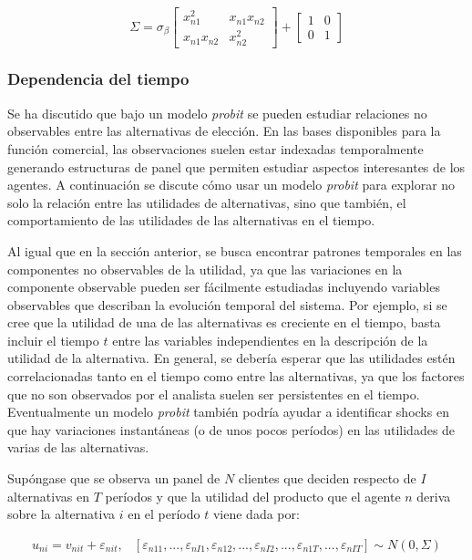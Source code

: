 \documentclass[
]{book}
\begin{document}
\[Σ= \sigma_\beta \begin{bmatrix}x^2_{n1} & x_{n1}x_{n2}\\
x_{n1}x_{n2} & x^2_{n2} \end{bmatrix} + \begin{bmatrix}1 & 0\\
0 & 1\end{bmatrix}\]

\subsubsection{Dependencia del tiempo}\label{dependencia-del-tiempo}

Se ha discutido que bajo un modelo \emph{probit} se pueden estudiar relaciones no observables entre las alternativas de elección. En las bases disponibles para la función comercial, las observaciones suelen estar indexadas temporalmente generando estructuras de panel que permiten estudiar aspectos interesantes de los agentes. A continuación se discute cómo usar un modelo \emph{probit} para explorar no solo la relación entre las utilidades de alternativas, sino que también, el comportamiento de las utilidades de las alternativas en el tiempo.

Al igual que en la sección anterior, se busca encontrar patrones temporales en las componentes no observables de la utilidad, ya que las variaciones en la componente observable pueden ser fácilmente estudiadas incluyendo variables observables que describan la evolución temporal del sistema. Por ejemplo, si se cree que la utilidad de una de las alternativas es creciente en el tiempo, basta incluir el tiempo \(t\) entre las variables independientes en la descripción de la utilidad de la alternativa. En general, se debería esperar que las utilidades estén correlacionadas tanto en el tiempo como entre las alternativas, ya que los factores que no son observados por el analista suelen ser persistentes en el tiempo. Eventualmente un modelo \emph{probit} también podría ayudar a identificar shocks en que hay variaciones instantáneas (o de unos pocos períodos) en las utilidades de varias de las alternativas.

Supóngase que se observa un panel de \(N\) clientes que deciden respecto de \(I\) alternativas en \(T\) períodos y que la utilidad del producto que el agente \(n\) deriva sobre la alternativa \(i\) en el período \(t\) viene dada por:

\begin{equation} 
  \begin{array}{cc}
    u_{ni} = v_{nit} + \varepsilon_{nit},  & [\varepsilon_{n11},...,\varepsilon_{nI1},\varepsilon_{n12}, ..., \varepsilon_{nI2},...,\varepsilon_{n1T},...,\varepsilon_{nIT}] \sim N(0,Σ)
  \end{array}  
  \label{eq:cdeterministaequi}
\end{equation}
\end{document}
